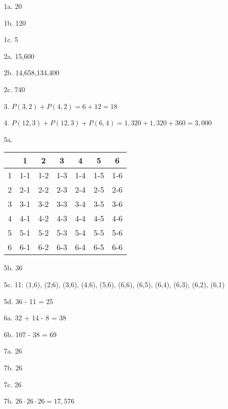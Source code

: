 
\newcommand{\laClass}       {CS 211}
\newcommand{\laSemester}    {Spring 2018}
\newcommand{\laChapter}     {5.2}
\newcommand{\laType}        {Exercise}
\newcommand{\laPoints}      {5}
\newcommand{\laTitle}       {Basic Rules for Counting}
\newcommand{\laDate}        {Jan 18, 2018}
\setcounter{chapter}{5}
\setcounter{section}{2}
\addtocounter{section}{-1}

\toggletrue{answerkey}





    \begin{itemize}
        \item[1a.]  20
        \item[1b.]  120
        \item[1c.]  5
        \item[2a.]  15,600
        \item[2b.]  14,658,134,400
        \item[2c.]  740
        \item[3.]   $P(3,2) + P(4,2) = 6 + 12 = 18$
        \item[4.]   $P(12,3) + P(12,3) + P(6,4) = 1,320 + 1,320 + 360 = 3,000$
        
        \item[5a.]  
                    \begin{tabular}{ c | c c c c c c}
                        & 1 & 2 & 3 & 4 & 5 & 6
                        \\ \hline
                        1 & 1-1 & 1-2 & 1-3 & 1-4 & 1-5 & 1-6
                        \\
                        2 & 2-1 & 2-2 & 2-3 & 2-4 & 2-5 & 2-6
                        \\
                        3 & 3-1 & 3-2 & 3-3 & 3-4 & 3-5 & 3-6
                        \\
                        4 & 4-1 & 4-2 & 4-3 & 4-4 & 4-5 & 4-6
                        \\
                        5 & 5-1 & 5-2 & 5-3 & 5-4 & 5-5 & 5-6
                        \\
                        6 & 6-1 & 6-2 & 6-3 & 6-4 & 6-5 & 6-6
                    \end{tabular}
        \item[5b.]  36
        \item[5c.]  11: (1,6), (2,6), (3,6), (4,6), (5,6), (6,6), (6,5), (6,4), (6,3), (6,2), (6,1)
        \item[5d.]  36 - 11 = 25
        
        \item[6a.]  32 + 14 - 8 = 38
        \item[6b.]  107 - 38 = 69
        
        \item[7a.]  26
        \item[7b.]  26
        \item[7c.]  26
        \item[7b.]  $26 \cdot 26 \cdot 26 = 17,576$
    \end{itemize}



